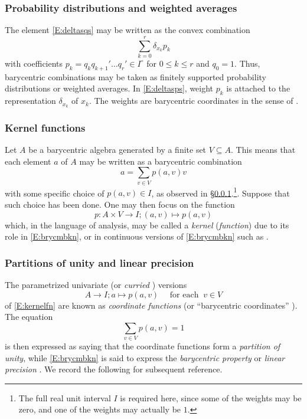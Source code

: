 \documentclass[12pt]{amsart}
\theoremstyle{plain}
\theoremstyle{definition}
\numberwithin{equation}{section}
\begin{document}
\subsubsection{Probability distributions and weighted averages}\label{SSS:PrDiWeAv}


The element \eqref{E:deltasqs} may be written as the convex combination
\begin{equation}\label{E:deltasps}
\sum_{k=0}^r\delta_{x_k}p_k
\end{equation}
with coefficients $p_k=q_kq_{k+1}'\dots q_r'\in I^\circ$ for $0\le k\le r$ and $q_0=1$. Thus, barycentric combinations may be taken as finitely supported probability distributions or weighted averages. In \eqref{E:deltasps}, weight $p_k$ is attached to the representation $\delta_{x_k}$ of $x_k$. The weights are barycentric coordinates in the sense of \cite[\S31]{Moebius}.

\subsubsection{Kernel functions}\label{SSS:KernlFun}
Let $A$ be a barycentric algebra generated by a finite set $V\subseteq A$. This means that each element $a$ of $A$ may be written as a barycentric combination
\begin{equation}\label{E:brycmbkn}
a=\sum_{v\in V}p(a,v)v
\end{equation}
with some specific choice of $p(a,v)\in I$, as observed in \S\ref{SSS:PrDiWeAv}.\footnote{The full real unit interval $I$ is required here, since some of the weights may be zero, and one of the weights may actually be $1$.}. Suppose that such choice has been done. One may then focus on the function
\begin{equation}\label{E:kernelfn}
p\colon A\times V\to I;(a,v)\mapsto p(a,v)
\end{equation}
which, in the language of analysis, may be called a \emph{kernel} (\emph{function}) due to its role in \eqref{E:brycmbkn}, or in continuous versions of \eqref{E:brycmbkn} such as \cite[\S3.1]{KosBarW}.

\subsubsection{Partitions of unity and linear precision}\label{SSS:P1LinPre}

The parametrized univariate (or \emph{curried} \cite[\S O.3.4]{PMA}) versions 
\begin{equation}\label{E:CoordFun}
A\to I;a\mapsto p(a,v)
\quad
\mbox{ for each }
\
v\in V
\end{equation}
of \eqref{E:kernelfn} are known as \emph{coordinate functions} (or ``barycentric coordinates'' \cite[\S1.1]{WarSchHirDes}). The equation
\begin{equation}\label{E:PartoOne}
\sum_{v\in V}p(a,v)=1
\end{equation}
is then expressed as saying that the coordinate functions form a \emph{partition of unity}, while \eqref{E:brycmbkn} is said to express the \emph{barycentric property} \cite[(3)]{KosBarW} or \emph{linear precision} \cite[\S1.1]{WarSchHirDes}. We record the following for subsequent reference.
\end{document}
